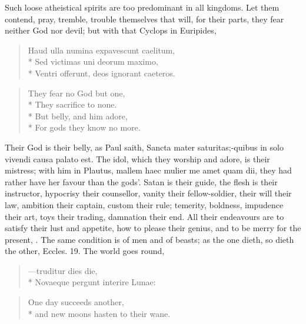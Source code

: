 {Such loose atheistical spirits are too predominant in all
kingdoms. Let them contend, pray, tremble, trouble themselves that
will, for their parts, they fear neither God nor devil; but with that
Cyclops in Euripides,

\begin{latin}
\begin{verse}
Haud ulla numina expavescunt caelitum,\\*
Sed victimas uni deorum maximo,\\*
Ventri offerunt, deos ignorant caeteros.
\end{verse}
\end{latin}

\begin{verse}
They fear no God but one,\\*
They sacrifice to none.\\*
But belly, and him adore,\\*
For gods they know no more.
\end{verse}

Their God is their belly, as Paul saith, Sancta mater saturitas;-quibus
in solo vivendi causa palato est. The idol, which they worship and
adore, is their mistress; with him in Plautus, mallem haec mulier me
amet quam dii, they had rather have her favour than the gods'. Satan is
their guide, the flesh is their instructor, hypocrisy their counsellor,
vanity their fellow-soldier, their will their law, ambition their
captain, custom their rule; temerity, boldness, impudence their art,
toys their trading, damnation their end. All their endeavours are to
satisfy their lust and appetite, how to please their genius, and to be
merry for the present, . The same condition is of men and of beasts; as the one
dieth, so dieth the other, Eccles.  19. The world goes round,

\begin{latin}
\begin{verse}
---truditur dies die,\\*
Novaeque pergunt interire Lunae:
\end{verse}
\end{latin}

\begin{verse}
One day succeeds another,\\*
and new moons hasten to their wane.
\end{verse}

}
